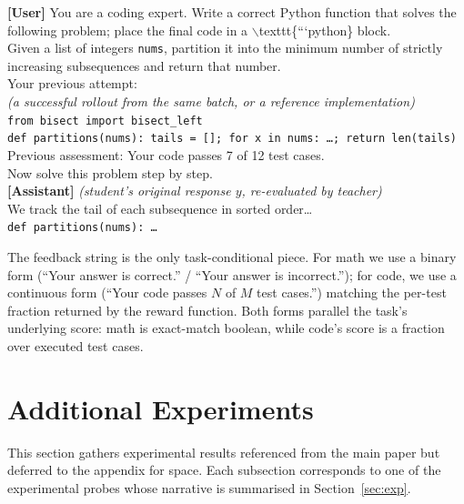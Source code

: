 \documentclass{article}
\begin{document}
\begin{tcolorbox}[breakable,colback=gray!3,colframe=gray!50,title={\small Code (LiveCodeBench v6 / Dolci-RLZero) --- self-teacher context},fonttitle=\bfseries\small,boxrule=0.5pt,arc=2pt,left=4pt,right=4pt,top=2pt,bottom=2pt]
  \small\ttfamily
  {\color{sysblue}\textbf{[User]}} {\color{sysblue}You are a coding expert. Write a correct Python function that solves the following problem; place the final code in a $\backslash$texttt\{```python\} block.}\\
  {\color{sysblue}Given a list of integers \texttt{nums}, partition it into the minimum number of strictly increasing subsequences and return that number.}\\[3pt]
  Your previous attempt:\\
  \textrm{\textit{(a successful rollout from the same batch, or a reference implementation)}}\\
  \texttt{from bisect import bisect\_left}\\
  \texttt{def partitions(nums): tails = []; for x in nums: \ldots; return len(tails)}\\[3pt]
  {\color{fbredcolor}Previous assessment: Your code passes 7 of 12 test cases.}\\[3pt]
  Now solve this problem step by step.\\[3pt]
  {\color{respgreen}\textbf{[Assistant]}} {\color{respgreen}\textit{(student's original response $y$, re-evaluated by teacher)}}\\
  {\color{respgreen}We track the tail of each subsequence in sorted order\ldots}\\
  {\color{respgreen}\texttt{def partitions(nums): \ldots}}
\end{tcolorbox}

The feedback string is the only task-conditional piece. For math we use a binary form (``Your answer is correct.'' / ``Your answer is incorrect.''); for code, we use a continuous form (``Your code passes $N$ of $M$ test cases.'') matching the per-test fraction returned by the reward function. Both forms parallel the task's underlying score: math is exact-match boolean, while code's score is a fraction over executed test cases.

\section{Additional Experiments}
\label{app:experiments}

This section gathers experimental results referenced from the main paper but deferred to the appendix for space. Each subsection corresponds to one of the experimental probes whose narrative is summarised in Section~\ref{sec:exp}.
\end{document}
